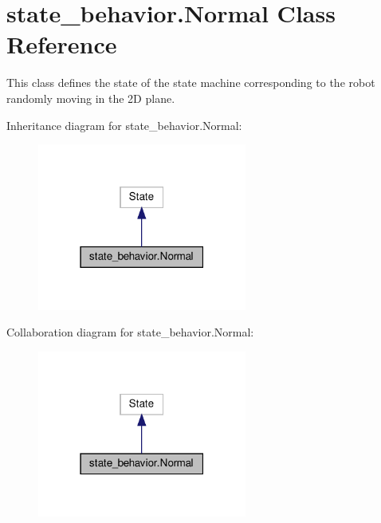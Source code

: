 \hypertarget{classstate__behavior_1_1Normal}{}\section{state\+\_\+behavior.\+Normal Class Reference}
\label{classstate__behavior_1_1Normal}


This class defines the state of the state machine corresponding to the robot randomly moving in the 2D plane.  




Inheritance diagram for state\+\_\+behavior.\+Normal\+:\nopagebreak
\begin{figure}[H]
\begin{center}
\leavevmode
\includegraphics[width=195pt]{classstate__behavior_1_1Normal__inherit__graph}
\end{center}
\end{figure}


Collaboration diagram for state\+\_\+behavior.\+Normal\+:\nopagebreak
\begin{figure}[H]
\begin{center}
\leavevmode
\includegraphics[width=195pt]{classstate__behavior_1_1Normal__coll__graph}
\end{center}
\end{figure}
